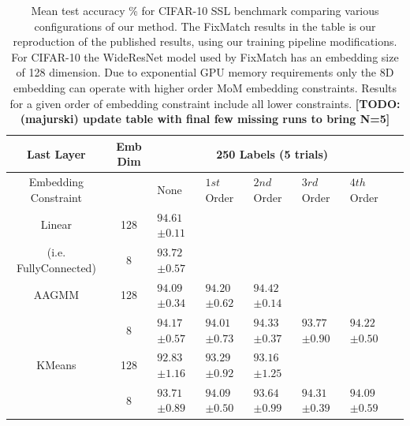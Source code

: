 \documentclass[10pt,twocolumn,letterpaper]{article}
\newcommand{\TODO}[1]{\textbf{\color{red}[TODO: #1]}}
\begin{document}
\begin{table}[ht!]
\begin{tabularx}{\textwidth}{c|c|XXXXXX}
		\hline\hline
		Last Layer  &   Emb Dim  & \multicolumn{5}{c}{250 Labels (5 trials)}            \\ 
		\hline
		\multicolumn{1}{c|}{Embedding Constraint} &  & None & $1st$ Order & $2nd$ Order & $3rd$ Order & $4th$ Order  \\ 
		\hline
		Linear & 128  & $94.61$ \scriptsize{$\pm 0.11$}   &  &  &  &   \\
		(i.e. FullyConnected) & 8  & $93.72$ \scriptsize{$\pm 0.57$}      &  &  &  &   \\
		\hline
		AAGMM & 128  & $94.09$ \scriptsize{$\pm 0.34$}    & $94.20$ \scriptsize{$\pm 0.62$} & $94.42$ \scriptsize{$\pm 0.14$} &  &  \\
		& 8  & $94.17$ \scriptsize{$\pm 0.57$}    & $94.01$ \scriptsize{$\pm 0.73$} & $94.33$ \scriptsize{$\pm 0.37$} & $93.77$ \scriptsize{$\pm 0.90$} & $94.22$ \scriptsize{$\pm 0.50$} \\
		\hline
		KMeans & 128  & $92.83$ \scriptsize{$\pm 1.16$}    & $93.29$ \scriptsize{$\pm 0.92$} & $93.16$ \scriptsize{$\pm 1.25$} &  &  \\
		& 8  & $93.71$ \scriptsize{$\pm 0.89$}    & $94.09$ \scriptsize{$\pm 0.50$} & $93.64$ \scriptsize{$\pm 0.99$} & $94.31$ \scriptsize{$\pm 0.39$} & $94.09$ \scriptsize{$\pm 0.59$}  \\
	\end{tabularx}
	\caption{Mean test accuracy \% for CIFAR-10 SSL benchmark comparing various configurations of our method. The FixMatch results in the table is our reproduction of the published results, using our training pipeline modifications. For CIFAR-10 the WideResNet model used by FixMatch has an embedding size of 128 dimension. Due to exponential GPU memory requirements only the 8D embedding can operate with higher order MoM embedding constraints. Results for a given order of embedding constraint include all lower constraints. \TODO{(majurski) update table with final few missing runs to bring N=5}}
	\label{table1}
\end{table}
\end{document}
